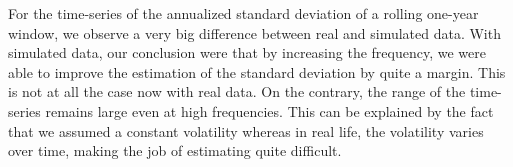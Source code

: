 \documentclass[10pt]{article}
\newenvironment{exercise}[2][Exercise]{\begin{trivlist}
  \item[\hskip \labelsep {\bfseries #1}\hskip \labelsep {\bfseries #2.}]}{\end{trivlist}}
\begin{document}
\begin{exercise}{4}
	\smallbreak
	
	For the time-series of the annualized standard deviation of a rolling one-year window, we observe a very big difference between real and simulated data. With simulated data, our conclusion were that by increasing the frequency, we were able to improve the estimation of the standard deviation by quite a margin. This is not at all the case now with real data. On the contrary, the range of the time-series remains large even at high frequencies. This can be explained by the fact that we assumed a constant volatility whereas in real life, the volatility varies over time, making the job of estimating quite difficult. 
 
  \end{exercise} 


\end{document}
